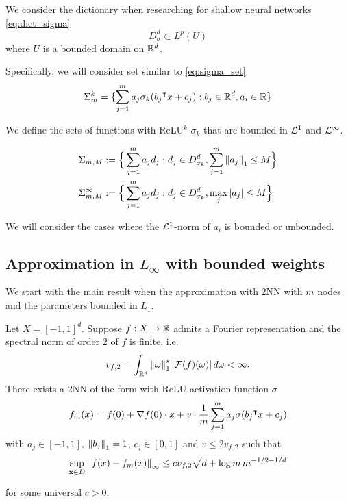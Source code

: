 We consider the dictionary when researching for shallow neural networks
\eqref{eq:dict_sigma}
\begin{equation}
    D^d_{\sigma} \subset L^p(U)
\end{equation}
where $U$ is a bounded domain on $\mathbb{R}^d$.

Specifically, we will consider set similar to \eqref{eq:sigma_set}
\begin{equation}
    \Sigma_m^k = \{\sum_{j=1}^m a_j \sigma_k (b_j{}^{\intercal} x + c_j): 
    b_j \in \mathbb{R}^d, a_i \in \mathbb{R}\} 
\end{equation}

We define the sets of functions with ReLU$^k$ $\sigma_k$ that are bounded in
$\mathcal{L}^{1}$ and $\mathcal{L}^{\infty}$.

\begin{align*}
    \Sigma_{m,M} &:= \Big\{
        \sum_{j=1}^m a_j d_j:
        d_j \in D^d_{\sigma_k}, \sum_{j=1}^m \left\| a_j \right\|_1 \leq M 
    \Big\} \\
    \Sigma_{m,M}^{\infty} &:= \Big\{
        \sum_{j=1}^m a_j d_j:
        d_j \in D^d_{\sigma_k}, \max_{j} \left| a_j \right| \leq M 
    \Big\}
\end{align*}

We will consider the cases where the $\mathcal{L}^{1}$-norm of $a_i$ is bounded or
unbounded.

\subsection{Approximation in $L_{\infty}$ with bounded weights}

We start with the main result when the approximation with 2NN with $m$ nodes and 
the parameters bounded in $L_1$.

\begin{theorem}
    \label{thm:appro_bound_l1}
    Let $X = [-1,1]^d$. Suppose $f: X \to \mathbb{R}$ admits a Fourier representation
    and the spectral norm of order $2$ of $f$ is finite, i.e.
    \begin{equation}
        v_{f,2} = \int_{\mathbb{R}^d} \left\| \omega \right\|_1^s \left| \mathcal{F}(f)(\omega) \right| 
        d\omega < \infty.
    \end{equation}
    There exists a 2NN of the form with ReLU activation function $\sigma$
    \begin{equation}
        f_m(x) = f(0) + \nabla f(0) \cdot x + v \cdot 
        \frac{1}{m} \sum_{j=1}^m a_j \sigma(b_j{}^{\intercal} x + c_j)
    \end{equation}
    with $a_j\in[-1,1]$, $\left\| b_j \right\|_1 = 1$, $c_j\in[0,1]$ and $v \leq
    2v_{f,2}$ such that
    \begin{equation}
        \sup_{\mathbf{x} \in D} \left\| f(x) - f_m(x) \right\|_{\infty} \leq c v_{f,2} \sqrt{d+\log{m}} \, m^{-1/2-1/d}
    \end{equation}

    for some universal $c > 0$.
\end{theorem}

